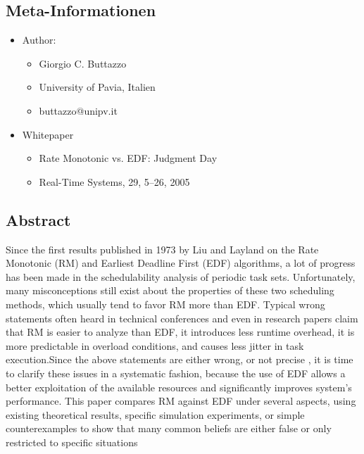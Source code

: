 \subsection{Meta-Informationen}
\begin{frame}{\subsecname}
	\begin{itemize}
		\item Author:
		\begin{itemize}
			\item Giorgio C. Buttazzo
			\item University of Pavia, Italien
			\item buttazzo@unipv.it
		\end{itemize}
		\item Whitepaper
		\begin{itemize}
			\item Rate Monotonic vs. EDF: Judgment Day
			\item Real-Time Systems, 29, 5–26, 2005
		\end{itemize}						
		
	\end{itemize}
\end{frame}

\subsection{Abstract}
\begin{frame}{\subsecname}
\tiny Since the first results published in 1973 by Liu and Layland on the Rate Monotonic (RM) and Earliest Deadline First (EDF) algorithms, a lot of progress has been made in the schedulability analysis of periodic task sets. Unfortunately, many misconceptions still exist about the properties of these two scheduling methods, which usually tend to favor RM more than EDF. Typical wrong statements often heard in technical conferences and even in research papers claim that RM is easier to analyze than EDF, it introduces less runtime overhead, it is more predictable in overload conditions, and causes less jitter in task execution.Since the above statements are either wrong, or not precise \tiny, it is time to clarify these issues in a systematic fashion, because the use of EDF allows a better exploitation of the available resources and significantly improves system’s performance. This paper compares RM against EDF under several aspects, using existing theoretical results, specific simulation experiments, or simple counterexamples to show that many common beliefs are either false or only restricted to specific situations
\end{frame}

